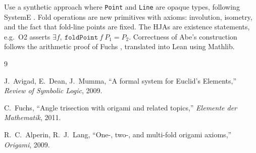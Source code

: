 \documentclass{article}
\begin{document}
Use a synthetic approach where \texttt{Point} and \texttt{Line} are
opaque types, following SystemE \cite{avigad2009}. Fold operations are
new primitives with axioms: involution, isometry, and the fact that fold-line
points are fixed. The HJAs are existence statements, e.g.\ O2 asserts
$\exists f,\ \texttt{foldPoint}\ f\ P_1 = P_2$. Correctness of Abe's
construction follows the arithmetic proof of Fuchs \cite{fuchs2011},
translated into Lean using Mathlib.

\begin{thebibliography}{9}
\setlength{\itemsep}{0pt}

J.~Avigad, E.~Dean, J.~Mumma,
``A formal system for Euclid's Elements,''
\textit{Review of Symbolic Logic}, 2009.

C.~Fuchs,
``Angle trisection with origami and related topics,''
\textit{Elemente der Mathematik}, 2011.

R.~C.~Alperin, R.~J.~Lang,
``One-, two-, and multi-fold origami axioms,''
\textit{Origami}, 2009.

\end{thebibliography}
\end{document}
